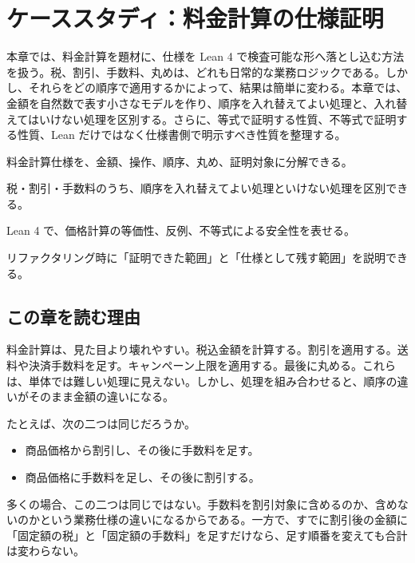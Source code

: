\chapter{ケーススタディ：料金計算の仕様証明}
\label{chap:ch20_price_spec}

\begin{chapterabstract}
本章では、料金計算を題材に、仕様を Lean 4 で検査可能な形へ落とし込む方法を扱う。税、割引、手数料、丸めは、どれも日常的な業務ロジックである。しかし、それらをどの順序で適用するかによって、結果は簡単に変わる。本章では、金額を自然数で表す小さなモデルを作り、順序を入れ替えてよい処理と、入れ替えてはいけない処理を区別する。さらに、等式で証明する性質、不等式で証明する性質、Lean だけではなく仕様書側で明示すべき性質を整理する。
\end{chapterabstract}

\begin{learninggoals}
\item 料金計算仕様を、金額、操作、順序、丸め、証明対象に分解できる。
\item 税・割引・手数料のうち、順序を入れ替えてよい処理といけない処理を区別できる。
\item Lean 4 で、価格計算の等価性、反例、不等式による安全性を表せる。
\item リファクタリング時に「証明できた範囲」と「仕様として残す範囲」を説明できる。
\end{learninggoals}

\section{この章を読む理由}

料金計算は、見た目より壊れやすい。税込金額を計算する。割引を適用する。送料や決済手数料を足す。キャンペーン上限を適用する。最後に丸める。これらは、単体では難しい処理に見えない。しかし、処理を組み合わせると、順序の違いがそのまま金額の違いになる。

たとえば、次の二つは同じだろうか。

\begin{itemize}
\item 商品価格から割引し、その後に手数料を足す。
\item 商品価格に手数料を足し、その後に割引する。
\end{itemize}

多くの場合、この二つは同じではない。手数料を割引対象に含めるのか、含めないのかという業務仕様の違いになるからである。一方で、すでに割引後の金額に「固定額の税」と「固定額の手数料」を足すだけなら、足す順番を変えても合計は変わらない。

